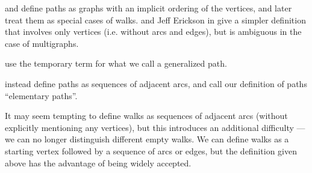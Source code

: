\begin{comments}
  \item {} and  define paths as  graphs with an implicit ordering of the vertices, and later treat them as special cases of walks.  and Jeff Erickson in \cite[191]{Erickson2019} give a simpler definition that involves only vertices (i.e. without arcs and edges), but is ambiguous in the case of multigraphs.

  \item {} use the temporary term  for what we call a generalized path.

  \item {} instead define paths as sequences of adjacent arcs, and call our definition of paths \enquote{elementary paths}.

  \item It may seem tempting to define walks as sequences of adjacent arcs (without explicitly mentioning any vertices), but this introduces an additional difficulty --- we can no longer distinguish different empty walks. We can define walks as a starting vertex followed by a sequence of arcs or edges, but the definition given above has the advantage of being widely accepted.
\end{comments}

